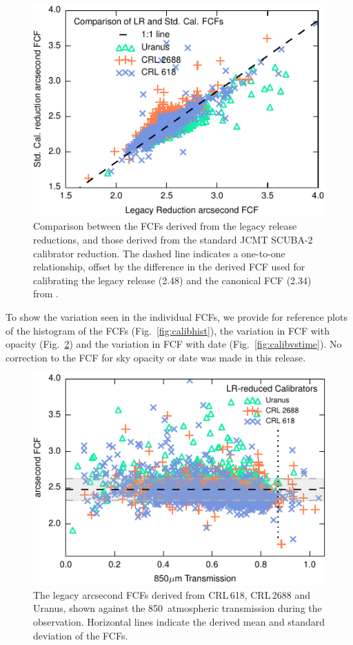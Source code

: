 \documentclass[twocolumn,times]{aastex6}
\begin{document}
\begin{figure}
\includegraphics{legacyFCF-caldbFCF-scatter.pdf}
\caption{Comparison between the FCFs derived from the legacy release
  reductions, and those derived from the standard JCMT SCUBA-2
  calibrator reduction. The dashed line indicates a one-to-one
  relationship, offset by the difference in the derived FCF used for
  calibrating the legacy release (2.48) and the canonical FCF (2.34)
  from \citet{Dempsey2013}. \label{fig:lr-caldb-scatter} }
\end{figure}


To show the variation seen in the individual FCFs, we provide for
reference plots of the histogram of the FCFs
(Fig.~\ref{fig:calibhist}), the variation in FCF with opacity
(Fig.~\ref{fig:calibvstrans}) and the variation in FCF with date
(Fig.~\ref{fig:calibvstime}). No correction to the FCF for sky opacity or date
was made in this release.

\begin{figure}
\includegraphics{legacyFCF-vs-transmission.pdf}
\caption{The legacy arcsecond FCFs derived from CRL\,618, CRL\,2688 and
  Uranus, shown against the 850\micron\ atmospheric transmission
  during the observation. Horizontal lines indicate the derived mean
  and standard deviation of the FCFs.\label{fig:calibvstrans}}
\end{figure}
\end{document}
